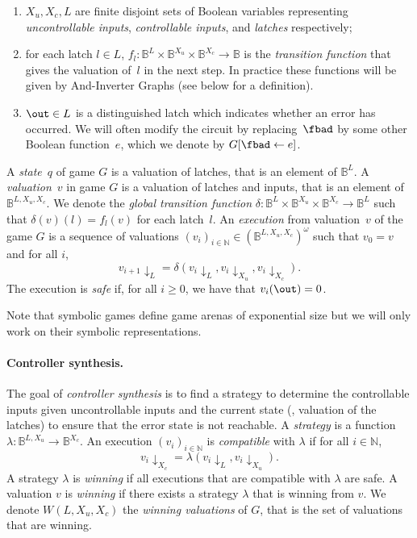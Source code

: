 \documentclass[submission,copyright,creativecommons]{eptcs}
\begin{document}
\begin{enumerate}
\item $X_u, X_c, L$ are finite disjoint sets of Boolean variables representing
	\emph{uncontrollable inputs}, \emph{controllable inputs}, and
	\emph{latches} respectively;
\item for each latch $l\in L$, $f_l \colon \mathbb{B}^L \times \mathbb{B}^{X_u}
	\times \mathbb{B}^{X_c} \to \mathbb{B}$ is the \emph{transition
	function} that gives the valuation of~$l$ in the next step. In practice
	these functions will be
	given by And-Inverter Graphs (see below for a definition).
\item $\out \in L$  is a distinguished latch which indicates whether an error
	has occurred.  We will often modify the circuit by replacing~$\fbad$ by
	some other Boolean function~$e$, which we denote by $G[\fbad \leftarrow e]$.
\end{enumerate}

A \emph{state}~$q$ of game $G$ is a valuation of latches, that is an element of
$\mathbb{B}^{L}$.  A \emph{valuation}~$v$ in game $G$ is a valuation of latches
and inputs, that is an element of $\mathbb{B}^{L,X_u,X_c}$.  We denote the
\emph{global transition function} $\delta \colon  \mathbb{B}^L \times
\mathbb{B}^{X_u} \times \mathbb{B}^{X_c} \to \mathbb{B}^L$ such that
$\delta(v)(l) = f_l(v)$ for each latch~$l$. 
An \emph{execution} from valuation~$v$ of the game $G$ is a sequence of
valuations $(v_i)_{i \in \mathbb{N}} \in \left(\mathbb{B}^{L, X_u,
X_c}\right)^\omega$ such that $v_0 = v$ and for all $i$,
$$
	v_{i+1}\downarrow_L =
	\delta(v_i \downarrow_L ,v_i \downarrow_{X_u},v_i \downarrow_{X_c}).
$$
The execution is \emph{safe} if, for all $i \ge 0$, we have that $v_i(\out) =
0$.

Note that symbolic games define game arenas of exponential size but we will only
work on their symbolic representations.

\paragraph{Controller synthesis.}
The goal of \emph{controller synthesis} is to find a strategy to determine the
controllable inputs given uncontrollable inputs and the current state (\ie,
valuation of the latches) to ensure
that the error state is not reachable.  A \emph{strategy} is a
function~$\lambda\colon \mathbb{B}^{L, X_u} \to \mathbb{B}^{X_c}$.  An execution
$(v_i)_{i \in \mathbb{N}}$ is \emph{compatible} with $\lambda$ if for all $i \in
\mathbb{N}$, 
\[
	v_i\downarrow_{X_c} = \lambda(v_i\downarrow_{L},v_i\downarrow_{X_u}).
\]
A strategy $\lambda$ is
\emph{winning} if all executions that are compatible with $\lambda$ are safe.  A
valuation $v$ is \emph{winning} if there exists a strategy $\lambda$ that is winning
from $v$.  We denote $W(L,X_u,X_c)$ the \emph{winning valuations} of $G$, that is
the set of valuations that are winning.
\end{document}

